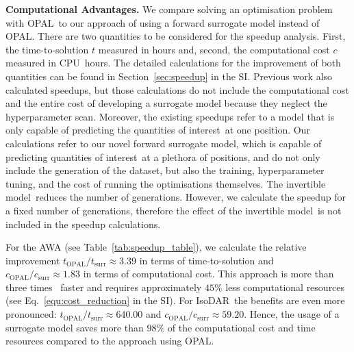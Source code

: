 \documentclass[a4paper, 12pt, version-1-compatibility]{article}
\def\invertiblemodel{invertible model}
\def\isodar{IsoDAR}
\def\opal{OPAL}
\def\qois{quantities of interest}
\newcommand{\tabref}[1]{Table~\ref{#1}}
\newcommand{\eqnref}[1]{Eq.~\ref{#1}}
\newcommand{\secref}[1]{Section~\ref{#1}}
\begin{document}



{\bf Computational Advantages.}
We compare solving an optimisation problem with \opal\ to our approach of using a forward surrogate model instead of \opal. There are two quantities to be considered for the speedup analysis. First, the time-to-solution $t$ measured in hours and, second, the computational cost $c$ measured in CPU~hours. The detailed calculations for the improvement of both quantities can be found in \secref{sec:speedup} in the SI. Previous work \cite{adelmann-2020-1} also calculated speedups, but those calculations do not include the computational cost and the entire cost of developing a surrogate model because they neglect the hyperparameter scan. Moreover, the existing speedups refer to a model that is only capable of predicting the \qois\ at one position. Our calculations refer to our novel forward surrogate model, which is capable of predicting \qois\ at a plethora of positions, and do not only include the generation of the dataset, but also the training, hyperparameter tuning, and the cost of running the optimisations themselves. The \invertiblemodel\ reduces the number of generations. However, we calculate the speedup for a fixed number of generations, therefore the effect of the \invertiblemodel\ is not included in the speedup calculations.

For the AWA (see \tabref{tab:speedup_table}), we calculate the relative improvement ${t_\mathrm{\opal}}/{t_\mathrm{surr}} \approx 3.39$ in terms of time-to-solution and ${c_\mathrm{\opal}}/{c_\mathrm{surr}} \approx 1.83$ in terms of computational cost. This approach is more than three times \
faster and requires approximately $45\%$ less computational resources (see \eqnref{equ:cost_reduction} in the SI). For \isodar\ the benefits are even more pronounced: ${t_\mathrm{\opal}}/{t_\mathrm{surr}} \approx 640.00$ and ${c_\mathrm{\opal}}/{c_\mathrm{surr}} \approx 59.20$. Hence, the usage of a surrogate model saves more than $98\%$ of the computational cost and time resources compared to the approach using \opal. 
\end{document}

